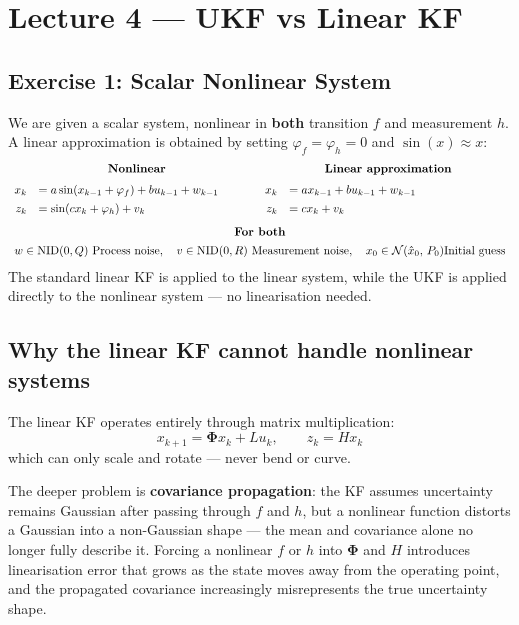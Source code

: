 \documentclass[12pt, a4paper]{article}
\begin{document}
\section*{Lecture 4 --- UKF vs Linear KF}
\vspace{-0.5cm}
\subsection*{Exercise 1: Scalar Nonlinear System}
\vspace{-0.2cm}
We are given a scalar system, nonlinear in \textbf{both} transition $f$ and measurement $h$.
A linear approximation is obtained by setting $\varphi_f = \varphi_h = 0$ and $\sin(x) \approx x$:
\[
\begin{array}{rl@{\qquad\qquad}rl}
  \multicolumn{2}{c}{\textbf{Nonlinear}} & \multicolumn{2}{c}{\textbf{Linear approximation}} \\[6pt]
  x_k &= a\sin(x_{k-1} + \varphi_f) + bu_{k-1} + w_{k-1}
  & x_k &= ax_{k-1} + bu_{k-1} + w_{k-1} \\[4pt]
  z_k &= \sin(cx_k + \varphi_h) + v_k
  & z_k &= cx_k + v_k \\[8pt]
  \multicolumn{4}{c}{\textbf{For both}} \\[4pt]
  \multicolumn{4}{c}{w \in \text{NID}(0,Q) \text{ Process noise}, \quad v \in \text{NID}(0,R) \text{ Measurement noise}, \quad x_0 \in \mathcal{N}(\hat{x}_0,\,P_0) \text{Initial guess}}
\end{array}
\]
The standard linear KF is applied to the linear system, while the UKF is applied
directly to the nonlinear system --- no linearisation needed.
\vspace{-0.4cm}
\subsection*{Why the linear KF cannot handle nonlinear systems}
\vspace{-0.2cm}
The linear KF operates entirely through matrix multiplication:
\[
  x_{k+1} = \boldsymbol{\Phi}x_k + Lu_k, \qquad z_k = Hx_k
\]
which can only scale and rotate --- never bend or curve.

The deeper problem is \textbf{covariance propagation}: the KF assumes uncertainty
remains Gaussian after passing through $f$ and $h$, but a nonlinear function
distorts a Gaussian into a non-Gaussian shape --- the mean and covariance alone
no longer fully describe it.
Forcing a nonlinear $f$ or $h$ into $\boldsymbol{\Phi}$ and $H$ introduces
linearisation error that grows as the state moves away from the operating point,
and the propagated covariance increasingly misrepresents the true uncertainty shape.
\vspace{-0.4cm}
\end{document}
